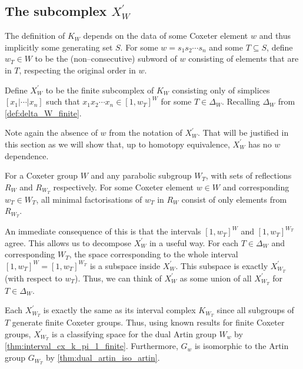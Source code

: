 \documentclass[class=article, crop=false]{standalone}
\begin{document}
\subsection{The subcomplex $X_{W}^\prime$}
The definition of $K_{W}$ depends on the data of some Coxeter element $w$ and thus implicitly some generating set $S$. For some $w = s_1s_2\cdots s_n$ and some $T\subseteq S$, define $w_T\in W$ to be the (non--consecutive) subword of $w$ consisting of elements that are in $T$, respecting the original order in $w$. 
\begin{definition}
    Define $X_{W}^\prime$ to be the finite subcomplex of $K_{W}$ consisting only of simplices $[x_1 | \cdots | x_n]$ such that $x_1x_2\cdots x_n \in [1,w_T]^W$ for some $T \in \Delta_W$. Recalling $\Delta_W$ from \cref{def:delta_W_finite}.
    \label{def:subcomplex_X_prime}
\end{definition}
Note again the absence of $w$ from the notation of $X^\prime_W$. That will be justified in this section as we will show that, up to homotopy equivalence, $X_W^\prime$ has no $w$ dependence.

\begin{lemma}[{\cite[Lemma 5.2]{paolini_salvetti_kpi1_2021}}]
    For a Coxeter group $W$ and any parabolic subgroup $W_T$, with sets of reflections $R_W$ and $R_{W_T}$ respectively. For some Coxeter element $w \in W$ and corresponding $w_T \in W_T$, all minimal factorisations of $w_T$ in $R_W$ consist of only elements from $R_{W_T}$.
\end{lemma}
An immediate consequence of this is that the intervals $[1,w_T]^W$ and $[1,w_T]^{W_T}$ agree. This allows us to decompose $X^\prime_W$ in a useful way. For each $T \in \Delta_W$ and corresponding $W_T$, the space corresponding to the whole interval $[1, w_T]^W=[1,w_T]^{W_T}$ is a subspace inside $X^\prime_W$. This subspace is exactly $X^\prime_{W_T}$ (with respect to $w_T$). Thus, we can think of $X^\prime_W$ as some union of all $X^\prime_{W_T}$ for $T \in \Delta_W$.

Each $X^\prime_{W_T}$ is exactly the same as its interval complex $K_{{W_T}}$ since all subgroups of $T$ generate finite Coxeter groups. Thus, using known results for finite Coxeter groups, $X^\prime_{W_T}$ is a classifying space for the dual Artin group $W_w$ by \cref{thm:interval_cx_k_pi_1_finite}. Furthermore, $G_w$ is isomorphic to the Artin group $G_{W_T}$ by \cref{thm:dual_artin_iso_artin}.
\end{document}
